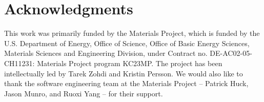 \documentclass[letterpaper,12pt]{formatfile}
\begin{document}
\section{Acknowledgments} \label{sec:ack}
This work was primarily funded by the Materials Project, which is funded by the U.S. Department of Energy, Office of Science, Office of Basic Energy Sciences, Materials Sciences and Engineering Division, under Contract no. DE-AC02-05-CH11231: Materials Project program KC23MP. The project has been intellectually led by Tarek Zohdi and Kristin Persson. We would also like to thank the software engineering team at the Materials Project -- Patrick Huck, Jason Munro, and Ruoxi Yang  -- for their support.



\end{document}
